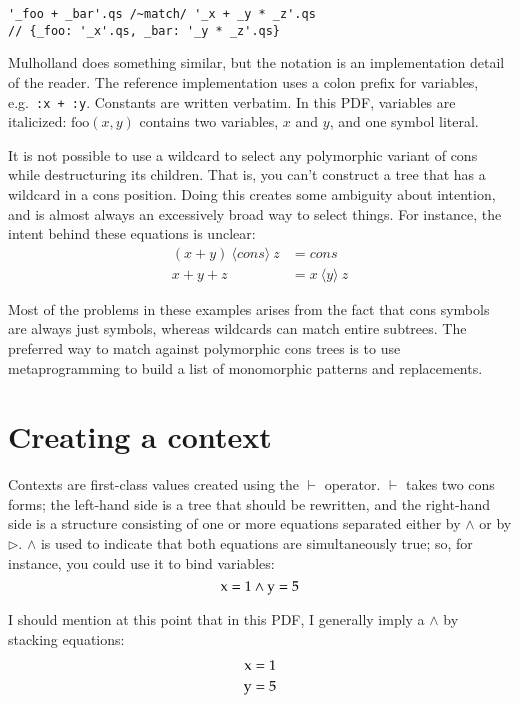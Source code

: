 \documentclass{report}
\begin{document}
\begin{verbatim}
'_foo + _bar'.qs /~match/ '_x + _y * _z'.qs
// {_foo: '_x'.qs, _bar: '_y * _z'.qs}
\end{verbatim}

    Mulholland does something similar, but the notation is an implementation detail of the reader. The reference implementation uses a colon prefix for variables, e.g.~{\tt :x + :y}. Constants
    are written verbatim. In this PDF, variables are italicized: $\textrm{foo}(x, y)$ contains two variables, $x$ and $y$, and one symbol literal.

    It is not possible to use a wildcard to select any polymorphic variant of cons while destructuring its children. That is, you can't construct a tree that has a wildcard in a cons position.
    Doing this creates some ambiguity about intention, and is almost always an excessively broad way to select things. For instance, the intent behind these equations is unclear:
\begin{align*}
(x + y)~\langle cons\rangle~z & = cons \\
x + y + z                     & = x~\langle y\rangle~z
\end{align*}

    Most of the problems in these examples arises from the fact that cons symbols are always just symbols, whereas wildcards can match entire subtrees. The preferred way to match against
    polymorphic cons trees is to use metaprogramming to build a list of monomorphic patterns and replacements.

\section{Creating a context}
    Contexts are first-class values created using the $\vdash$ operator. $\vdash$ takes two cons forms; the left-hand side is a tree that should be rewritten, and the right-hand side is a
    structure consisting of one or more equations separated either by $\wedge$ or by $\rhd$. $\wedge$ is used to indicate that both equations are simultaneously true; so, for instance, you
    could use it to bind variables:
    $$
      \textrm x = 1 \wedge \textrm y = 5
    $$

    I should mention at this point that in this PDF, I generally imply a $\wedge$ by stacking equations:
\begin{align*}
\textrm x & = 1 \\
\textrm y & = 5
\end{align*}
\end{document}
